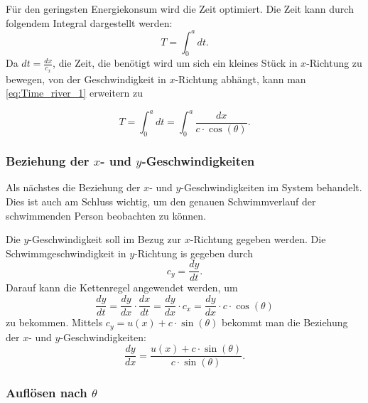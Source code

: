Für den geringsten Energiekonsum wird die Zeit optimiert. Die Zeit kann durch folgendem Integral dargestellt werden:
\begin{equation}
    T = \int_0^adt \label{eq:Time_river_1}.
\end{equation}
Da \(dt = \frac{dx}{c_x}\), die Zeit, die benötigt wird um sich ein kleines Stück in \(x\)-Richtung zu bewegen, von der Geschwindigkeit in \(x\)-Richtung abhängt, kann man \eqref{eq:Time_river_1} erweitern zu

\begin{equation}
    T = \int_0^adt = \int_0^a\frac{dx}{c\cdot \cos(\theta)} \label{eq:Time_river_2}.
\end{equation} 


\subsubsection{Beziehung der \(x\)- und \(y\)-Geschwindigkeiten}

Als nächstes die Beziehung der \(x\)- und \(y\)-Geschwindigkeiten im System behandelt. Dies ist auch am Schluss wichtig, um den genauen Schwimmverlauf der schwimmenden Person beobachten zu können.

Die \(y\)-Geschwindigkeit soll im Bezug zur \(x\)-Richtung gegeben werden. Die Schwimmgeschwindigkeit in \(y\)-Richtung is gegeben durch
\begin{equation}
    c_y = \frac{dy}{dt}.
\end{equation}
Darauf kann die Kettenregel angewendet werden, um
\begin{equation}
    \frac{dy}{dt} = \frac{dy}{dx} \cdot \frac{dx}{dt} = \frac{dy}{dx}\cdot c_x = \frac{dy}{dx}\cdot c\cdot \cos(\theta)
\end{equation}
zu bekommen. Mittels \(c_y = u(x) + c\cdot \sin(\theta)\) bekommt man die Beziehung der \(x\)- und \(y\)-Geschwindigkeiten:
\begin{equation}
    \frac{dy}{dx} = \frac{u(x) + c \cdot \sin(\theta)}{c \cdot \sin(\theta)}. \label{eq:dy_dx}
\end{equation}



\subsubsection{Auflösen nach \(\theta\)}

